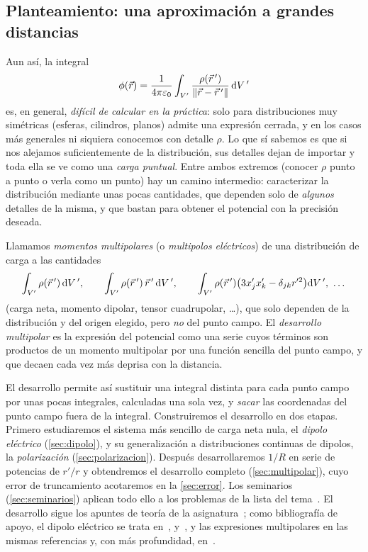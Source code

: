 \subsection{Planteamiento: una aproximación a grandes distancias}\label{sec:planteamiento}
Aun así, la integral
\begin{equation}\label{eq:pot-integral}
  \phi(\vec{r})=\frac{1}{4\pi\varepsilon_{0}}\int_{V'}\frac{\rho(\vec{r}\,')}{\lVert \vec{r}-\vec{r}\,'\rVert}\,\mathrm{d} V\,'
\end{equation}
es, en general, \emph{difícil de calcular en la práctica}: solo para distribuciones muy simétricas (esferas, cilindros, planos) admite una
expresión cerrada, y en los casos más generales ni siquiera conocemos con detalle $\rho$. Lo que sí sabemos es que si nos alejamos
suficientemente de la distribución, sus detalles dejan de importar y toda ella se ve como una \emph{carga puntual}. Entre ambos extremos
(conocer $\rho$ punto a punto o verla como un punto) hay un camino intermedio: caracterizar la distribución mediante unas pocas
cantidades, que dependen solo de \emph{algunos} detalles de la misma, y que bastan para obtener el potencial con la precisión deseada.

\begin{definicion}\label{def:multipolos}
Llamamos \emph{momentos multipolares} (o \emph{multipolos eléctricos}) de una distribución de carga a las cantidades
\[
  \int_{V'}\rho(\rp)\,\dVp,\qquad \int_{V'}\rho(\rp)\,\rp\,\dVp,\qquad \int_{V'}\rho(\rp)\bigl(3x'_jx'_k-\delt{j}{k}r'^{2}\bigr)\dVp,\ \dots
\]
(carga neta, momento dipolar, tensor cuadrupolar, \dots), que solo dependen de la distribución y del origen elegido, pero \emph{no} del
punto campo. El \emph{desarrollo multipolar} es la expresión del potencial como una serie cuyos términos son productos de un momento
multipolar por una función sencilla del punto campo, y que decaen cada vez más deprisa con la distancia.
\end{definicion}

El desarrollo permite así sustituir una integral distinta para cada punto campo por unas pocas integrales, calculadas una sola vez, y
\emph{sacar} las coordenadas del punto campo fuera de la integral. Construiremos el desarrollo en dos etapas. Primero estudiaremos el sistema más
sencillo de carga neta nula, el \emph{dipolo eléctrico} (\cref{sec:dipolo}), y su generalización a distribuciones continuas de dipolos, la
\emph{polarización} (\cref{sec:polarizacion}). Después desarrollaremos $1/R$ en serie de potencias de $r'/r$ y obtendremos el desarrollo
completo (\cref{sec:multipolar}), cuyo error de truncamiento acotaremos en la \cref{sec:error}. Los seminarios (\cref{sec:seminarios}) aplican
todo ello a los problemas de la lista del tema~\cite{PROBLEMAS-T2}. El desarrollo sigue los apuntes de teoría de la asignatura~\cite{APUNTES-T2}; como
bibliografía de apoyo, el dipolo eléctrico se trata en~\cite[cap.~3]{GRIFFITHS}, \cite[cap.~8]{WANGSNESS} y~\cite[cap.~4]{VICTORIANO}, y las expresiones multipolares en las
mismas referencias y, con más profundidad, en~\cite{JACKSON}.

